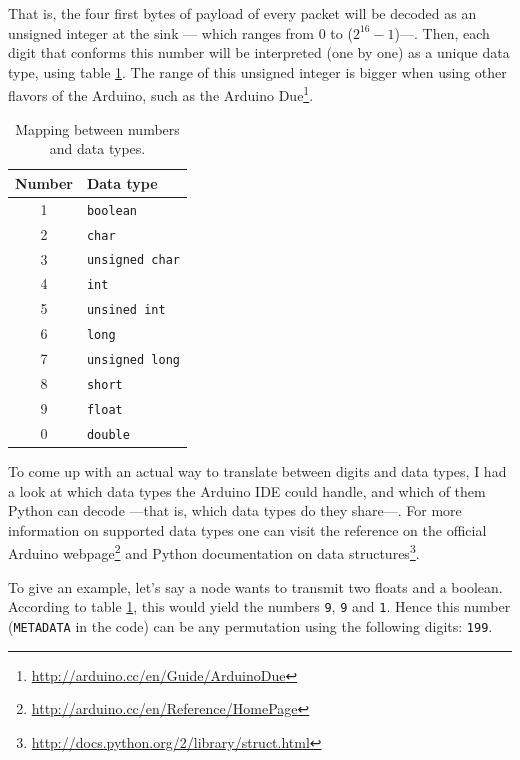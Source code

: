 That is, the four first bytes of payload of every packet will be decoded as an unsigned integer at the sink --- which ranges from $0$ to ($2^{16}-1$)---. Then, each digit that conforms this number will be interpreted (one by one) as a unique data type, using table \ref{tab:mapnumbers}. The range of this unsigned integer is bigger when using other flavors of the Arduino, such as the Arduino Due\footnote{\url{http://arduino.cc/en/Guide/ArduinoDue}}.

\begin{table}[ht] 
\centering
\begin{tabular}{c|l}
Number          & Data type             \\
\hline
1               & \texttt{boolean}      \\
2               & \texttt{char}         \\
3               & \texttt{unsigned char}\\
4               & \texttt{int}          \\
5               & \texttt{unsined int}  \\
6               & \texttt{long}         \\
7               & \texttt{unsigned long}\\
8               & \texttt{short}        \\
9               & \texttt{float}        \\
0               & \texttt{double}       \\
\end{tabular}
\caption{Mapping between numbers and data types.}
\label{tab:mapnumbers}
\end{table}

To come up with an actual way to translate between digits and data types, I had a look at which data types the Arduino IDE could handle, and which of them Python can decode ---that is, which data types do they share---. For more information on supported data types one can visit the reference on the official Arduino webpage\footnote{\url{http://arduino.cc/en/Reference/HomePage}} and Python documentation on data structures\footnote{\url{http://docs.python.org/2/library/struct.html}}.

To give an example, let's say a node wants to transmit two floats and a boolean. According to table \ref{tab:mapnumbers}, this would yield the numbers \texttt{9}, \texttt{9} and \texttt{1}. Hence this number (\texttt{METADATA} in the code) can be any permutation using the following digits: \texttt{199}.

